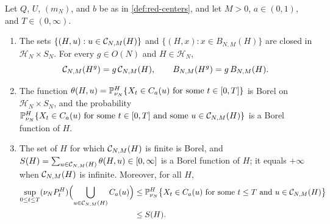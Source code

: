 \begin{lemma}\label{lem:red-unions}
Let $Q$, $U$, $(m_N)$, and $b$ be as in \cref{def:red-centers}, and let $M>0$, $a\in(0,1)$, and $T\in(0,\infty)$.
\begin{enumerate}[label=(\alph*)]
\item The sets $\{(H,u):u\in\mathcal C_{N,M}(H)\}$ and $\{(H,x):x\in B_{N,M}(H)\}$ are closed in $\mathcal H_N\times S_N$. For every $g\in O(N)$ and $H\in\mathcal H_N$,
\begin{equation}\label{eq:red-equivariance}
\mathcal C_{N,M}(H^g)=g\,\mathcal C_{N,M}(H),\qquad B_{N,M}(H^g)=g\,B_{N,M}(H).
\end{equation}
\item The function $\theta(H,u)=\mathbb P^H_{\nu_N}\{X_t\in C_a(u)\text{ for some }t\in[0,T]\}$ is Borel on $\mathcal H_N\times S_N$, and the probability $\mathbb P^H_{\nu_N}\{X_t\in C_a(u)\text{ for some }t\in[0,T]\text{ and some }u\in\mathcal C_{N,M}(H)\}$ is a Borel function of $H$.
\item The set of $H$ for which $\mathcal C_{N,M}(H)$ is finite is Borel, and $S(H)=\sum_{u\in\mathcal C_{N,M}(H)}\theta(H,u)\in[0,\infty]$ is a Borel function of $H$; it equals $+\infty$ when $\mathcal C_{N,M}(H)$ is infinite. Moreover, for all $H$,
\begin{equation}\label{eq:red-union-bound}
\begin{split}
\sup_{0\le t\le T}(\nu_NP^H_t)\Bigl(\bigcup_{u\in\mathcal C_{N,M}(H)}C_a(u)\Bigr)
&\le\mathbb P^H_{\nu_N}\bigl\{X_t\in C_a(u)\text{ for some }t\le T\text{ and }u\in\mathcal C_{N,M}(H)\bigr\}\\
&\le S(H).
\end{split}
\end{equation}
\end{enumerate}
\end{lemma}

